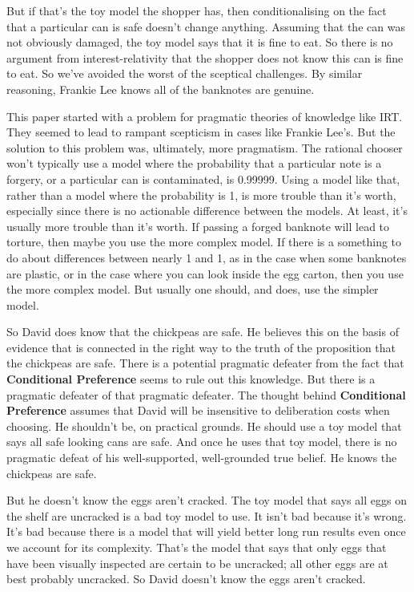 \documentclass[
  12pt,
]{article}
\begin{document}
But if that's the toy model the shopper has, then conditionalising on the fact that a particular can is safe doesn't change anything. Assuming that the can was not obviously damaged, the toy model says that it is fine to eat. So there is no argument from interest-relativity that the shopper does not know this can is fine to eat. So we've avoided the worst of the sceptical challenges. By similar reasoning, Frankie Lee knows all of the banknotes are genuine.

This paper started with a problem for pragmatic theories of knowledge like IRT. They seemed to lead to rampant scepticism in cases like Frankie Lee's. But the solution to this problem was, ultimately, more pragmatism. The rational chooser won't typically use a model where the probability that a particular note is a forgery, or a particular can is contaminated, is 0.99999. Using a model like that, rather than a model where the probability is 1, is more trouble than it's worth, especially since there is no actionable difference between the models. At least, it's usually more trouble than it's worth. If passing a forged banknote will lead to torture, then maybe you use the more complex model. If there is a something to do about differences between nearly 1 and 1, as in the case when some banknotes are plastic, or in the case where you can look inside the egg carton, then you use the more complex model. But usually one should, and does, use the simpler model.

So David does know that the chickpeas are safe. He believes this on the basis of evidence that is connected in the right way to the truth of the proposition that the chickpeas are safe. There is a potential pragmatic defeater from the fact that \textbf{Conditional Preference} seems to rule out this knowledge. But there is a pragmatic defeater of that pragmatic defeater. The thought behind \textbf{Conditional Preference} assumes that David will be insensitive to deliberation costs when choosing. He shouldn't be, on practical grounds. He should use a toy model that says all safe looking cans are safe. And once he uses that toy model, there is no pragmatic defeat of his well-supported, well-grounded true belief. He knows the chickpeas are safe.

But he doesn't know the eggs aren't cracked. The toy model that says all eggs on the shelf are uncracked is a bad toy model to use. It isn't bad because it's wrong. It's bad because there is a model that will yield better long run results even once we account for its complexity. That's the model that says that only eggs that have been visually inspected are certain to be uncracked; all other eggs are at best probably uncracked. So David doesn't know the eggs aren't cracked.
\end{document}
